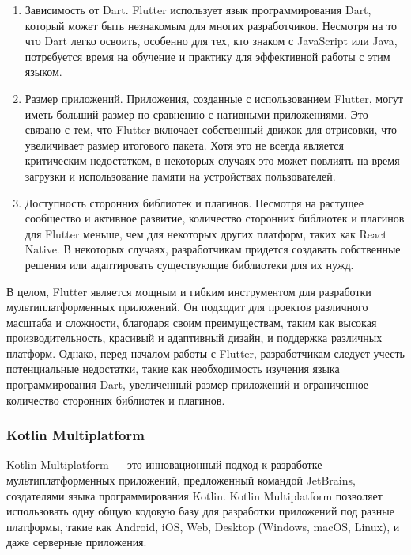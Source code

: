 \documentclass[14pt, russian]{scrartcl}
\begin{document}
\begin{enumerate}
    \item Зависимость от Dart. Flutter использует язык программирования Dart, который может быть незнакомым для многих разработчиков. Несмотря на то что Dart легко освоить, особенно для тех, кто знаком с JavaScript или Java, потребуется время на обучение и практику для эффективной работы с этим языком.
    \item Размер приложений. Приложения, созданные с использованием Flutter, могут иметь больший размер по сравнению с нативными приложениями. Это связано с тем, что Flutter включает собственный движок для отрисовки, что увеличивает размер итогового пакета. Хотя это не всегда является критическим недостатком, в некоторых случаях это может повлиять на время загрузки и использование памяти на устройствах пользователей.
    \item Доступность сторонних библиотек и плагинов. Несмотря на растущее сообщество и активное развитие, количество сторонних библиотек и плагинов для Flutter меньше, чем для некоторых других платформ, таких как React Native. В некоторых случаях, разработчикам придется создавать собственные решения или адаптировать существующие библиотеки для их нужд.
\end{enumerate}

В целом, Flutter является мощным и гибким инструментом для разработки мультиплатформенных приложений. Он подходит для проектов различного масштаба и сложности, благодаря своим преимуществам, таким как высокая производительность, красивый и адаптивный дизайн, и поддержка различных платформ. Однако, перед началом работы с Flutter, разработчикам следует учесть потенциальные недостатки, такие как необходимость изучения языка программирования Dart, увеличенный размер приложений и ограниченное количество сторонних библиотек и плагинов.

\subsubsection{Kotlin Multiplatform}\label{sect:kmm}

Kotlin Multiplatform --- это инновационный подход к разработке мультиплатформенных приложений, предложенный командой JetBrains, создателями языка программирования Kotlin. Kotlin Multiplatform позволяет использовать одну общую кодовую базу для разработки приложений под разные платформы, такие как Android, iOS, Web, Desktop (Windows, macOS, Linux), и даже серверные приложения.
\end{document}
